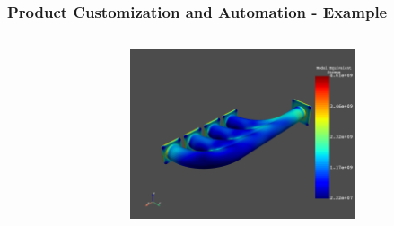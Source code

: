 \documentclass[t]{beamer}
\begin{document}

\begin{frame}[fragile=singleslide]
  \frametitle{Product Customization and Automation - Example}
  \vspace{-10pt}

  \begin{columns}[T]
    \begin{column}{.5\textwidth}
      \vspace{-5pt}
      \inputminted[fontsize=\footnotesize]{python}{code/pymapdl_example.py}
    \end{column}

    \begin{column}{.5\textwidth}
      \centering
      \includegraphics[height=5cm]{figures/sphx_glr_exhaust_manifold_thermal_stress_002.png}
    \end{column}

  \end{columns}

\end{frame}



\def\pyramidthree{

  \resizebox{.004\textwidth}{!}{
    \begin{tikzpicture}[overlay]
      \tikzset{shift={(current page.center)},xshift=39cm,yshift=-11.5cm}
    \coordinate (A) at (-4,0) {};
    \coordinate (B) at ( 4,0) {};
    \coordinate (C) at (0,6) {};
    \draw[name path=AC] (A) -- (C);
    \draw[name path=BC] (B) -- (C);
    \foreach \y/\A in {
      0/\color{lightgray} Core Library API,
      2/\color{lightgray} Product Automation API,
      4/\color{ANSYS@Bronze} Remote API/Network
    } {
      \path[name path=horiz] (A|-0,\y) -- (B|-0,\y);

      \draw[name intersections={of=AC and horiz,by=P},
        name intersections={of=BC and horiz,by=Q}] (P) -- (Q);

      \draw[name intersections={of=AC and horiz,by=P},
        name intersections={of=BC and horiz,by=Q}] (P) -- (Q)
      node[midway,above,shift={(-40ex,0ex)}] {\huge \A};

    }
  \end{tikzpicture}
  }

}
\end{document}
